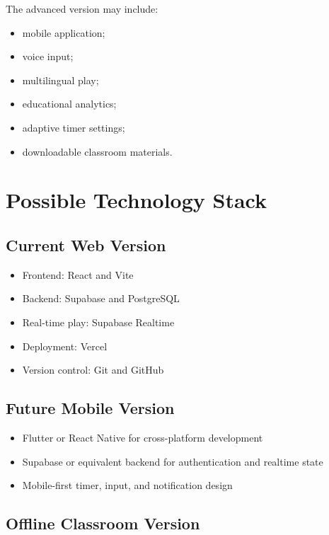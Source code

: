 \documentclass[11pt,a4paper]{article}
\begin{document}
The advanced version may include:

\begin{itemize}
    \item mobile application;
    \item voice input;
    \item multilingual play;
    \item educational analytics;
    \item adaptive timer settings;
    \item downloadable classroom materials.
\end{itemize}

\section{Possible Technology Stack}

\subsection{Current Web Version}

\begin{itemize}
    \item Frontend: React and Vite
    \item Backend: Supabase and PostgreSQL
    \item Real-time play: Supabase Realtime
    \item Deployment: Vercel
    \item Version control: Git and GitHub
\end{itemize}

\subsection{Future Mobile Version}

\begin{itemize}
    \item Flutter or React Native for cross-platform development
    \item Supabase or equivalent backend for authentication and realtime state
    \item Mobile-first timer, input, and notification design
\end{itemize}

\subsection{Offline Classroom Version}
\end{document}
